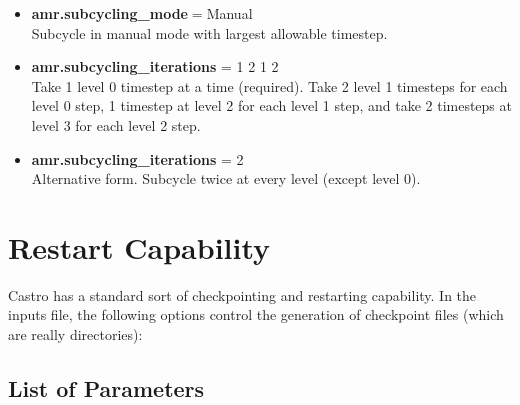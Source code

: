 \begin{itemize}

\item {\bf amr.subcycling\_mode}$ = $Manual \\
Subcycle in manual mode with largest allowable timestep.

\item {\bf amr.subcycling\_iterations} = 1 2 1 2\\
Take 1 level 0 timestep at a time (required). Take 2 level 1 timesteps for each level 0 step, 1 timestep at level 2 
for each level 1 step, and take 2 timesteps at level 3 for each level 
2 step.

\item {\bf amr.subcycling\_iterations} = 2\\
Alternative form. Subcycle twice at every level (except level 0).

\end{itemize}

\section{Restart Capability}

Castro has a standard sort of checkpointing and restarting capability. 
In the inputs file, the following options control the generation of checkpoint files (which are really
directories):\\

\subsection{List of Parameters}

